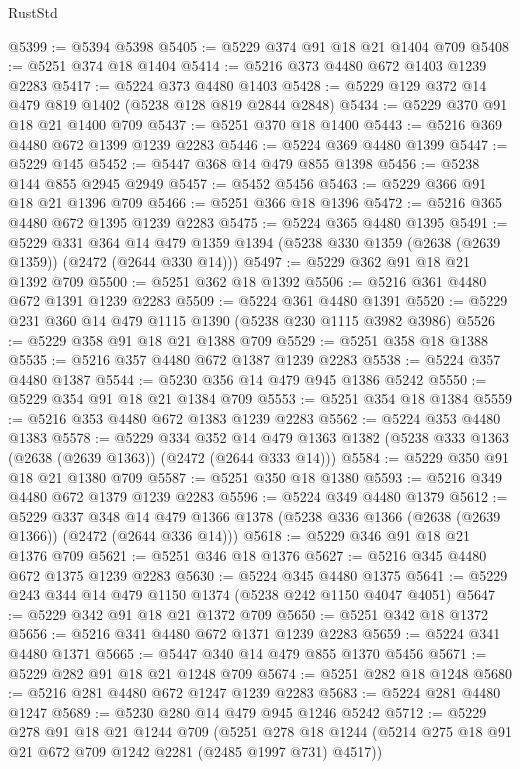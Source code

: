 \begin{lexlean}{RustStd}
\begin{coremodule}
@5399 := @5394 @5398
@5405 := @5229 @374 @91 @18 @21 @1404 @709
@5408 := @5251 @374 @18 @1404
@5414 := @5216 @373 @4480 @672 @1403 @1239 @2283
@5417 := @5224 @373 @4480 @1403
@5428 := @5229 @129 @372 @14 @479 @819 @1402 (@5238 @128 @819 @2844 @2848)
@5434 := @5229 @370 @91 @18 @21 @1400 @709
@5437 := @5251 @370 @18 @1400
@5443 := @5216 @369 @4480 @672 @1399 @1239 @2283
@5446 := @5224 @369 @4480 @1399
@5447 := @5229 @145
@5452 := @5447 @368 @14 @479 @855 @1398
@5456 := @5238 @144 @855 @2945 @2949
@5457 := @5452 @5456
@5463 := @5229 @366 @91 @18 @21 @1396 @709
@5466 := @5251 @366 @18 @1396
@5472 := @5216 @365 @4480 @672 @1395 @1239 @2283
@5475 := @5224 @365 @4480 @1395
@5491 := @5229
    @331
    @364
    @14
    @479
    @1359
    @1394
    (@5238 @330 @1359 (@2638 (@2639 @1359)) (@2472 (@2644 @330 @14)))
@5497 := @5229 @362 @91 @18 @21 @1392 @709
@5500 := @5251 @362 @18 @1392
@5506 := @5216 @361 @4480 @672 @1391 @1239 @2283
@5509 := @5224 @361 @4480 @1391
@5520 := @5229 @231 @360 @14 @479 @1115 @1390 (@5238 @230 @1115 @3982 @3986)
@5526 := @5229 @358 @91 @18 @21 @1388 @709
@5529 := @5251 @358 @18 @1388
@5535 := @5216 @357 @4480 @672 @1387 @1239 @2283
@5538 := @5224 @357 @4480 @1387
@5544 := @5230 @356 @14 @479 @945 @1386 @5242
@5550 := @5229 @354 @91 @18 @21 @1384 @709
@5553 := @5251 @354 @18 @1384
@5559 := @5216 @353 @4480 @672 @1383 @1239 @2283
@5562 := @5224 @353 @4480 @1383
@5578 := @5229
    @334
    @352
    @14
    @479
    @1363
    @1382
    (@5238 @333 @1363 (@2638 (@2639 @1363)) (@2472 (@2644 @333 @14)))
@5584 := @5229 @350 @91 @18 @21 @1380 @709
@5587 := @5251 @350 @18 @1380
@5593 := @5216 @349 @4480 @672 @1379 @1239 @2283
@5596 := @5224 @349 @4480 @1379
@5612 := @5229
    @337
    @348
    @14
    @479
    @1366
    @1378
    (@5238 @336 @1366 (@2638 (@2639 @1366)) (@2472 (@2644 @336 @14)))
@5618 := @5229 @346 @91 @18 @21 @1376 @709
@5621 := @5251 @346 @18 @1376
@5627 := @5216 @345 @4480 @672 @1375 @1239 @2283
@5630 := @5224 @345 @4480 @1375
@5641 := @5229 @243 @344 @14 @479 @1150 @1374 (@5238 @242 @1150 @4047 @4051)
@5647 := @5229 @342 @91 @18 @21 @1372 @709
@5650 := @5251 @342 @18 @1372
@5656 := @5216 @341 @4480 @672 @1371 @1239 @2283
@5659 := @5224 @341 @4480 @1371
@5665 := @5447 @340 @14 @479 @855 @1370 @5456
@5671 := @5229 @282 @91 @18 @21 @1248 @709
@5674 := @5251 @282 @18 @1248
@5680 := @5216 @281 @4480 @672 @1247 @1239 @2283
@5683 := @5224 @281 @4480 @1247
@5689 := @5230 @280 @14 @479 @945 @1246 @5242
@5712 := @5229
    @278
    @91
    @18
    @21
    @1244
    @709
    (@5251 @278 @18 @1244 (@5214 @275 @18 @91 @21 @672 @709 @1242 @2281 (@2485 @1997 @731) @4517))

\end{coremodule}
\end{lexlean}
